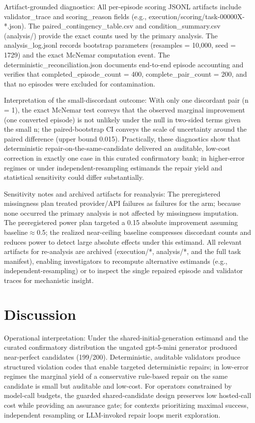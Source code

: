 \documentclass[conference]{IEEEtran}
\begin{document}
Artifact-grounded diagnostics: All per-episode scoring JSONL artifacts include validator\_trace and scoring\_reason fields (e.g., execution/scoring/task-00000X-*.json). The paired\_contingency\_table.csv and condition\_summary.csv (analysis/) provide the exact counts used by the primary analysis. The analysis\_log.jsonl records bootstrap parameters (resamples = 10,000, seed = 1729) and the exact McNemar computation event. The deterministic\_reconciliation.json documents end-to-end episode accounting and verifies that completed\_episode\_count = 400, complete\_pair\_count = 200, and that no episodes were excluded for contamination.

Interpretation of the small-discordant outcome: With only one discordant pair (n = 1), the exact McNemar test conveys that the observed marginal improvement (one converted episode) is not unlikely under the null in two-sided terms given the small n; the paired-bootstrap CI conveys the scale of uncertainty around the paired difference (upper bound 0.015). Practically, these diagnostics show that deterministic repair-on-the-same-candidate delivered an auditable, low-cost correction in exactly one case in this curated confirmatory bank; in higher-error regimes or under independent-resampling estimands the repair yield and statistical sensitivity could differ substantially.

Sensitivity notes and archived artifacts for reanalysis: The preregistered missingness plan treated provider/API failures as failures for the arm; because none occurred the primary analysis is not affected by missingness imputation. The preregistered power plan targeted a 0.15 absolute improvement assuming baseline\ensuremath{\approx}0.5; the realized near-ceiling baseline compresses discordant counts and reduces power to detect large absolute effects under this estimand. All relevant artifacts for re-analysis are archived (execution/*, analysis/*, and the full task manifest), enabling investigators to recompute alternative estimands (e.g., independent-resampling) or to inspect the single repaired episode and validator traces for mechanistic insight.

\section{Discussion}
Operational interpretation: Under the shared-initial-generation estimand and the curated confirmatory distribution the ungated gpt-5-mini generator produced near-perfect candidates (199/200). Deterministic, auditable validators produce structured violation codes that enable targeted deterministic repairs; in low-error regimes the marginal yield of a conservative rule-based repair on the same candidate is small but auditable and low-cost. For operators constrained by model-call budgets, the guarded shared-candidate design preserves low hosted-call cost while providing an assurance gate; for contexts prioritizing maximal success, independent resampling or LLM-invoked repair loops merit exploration.
\end{document}
